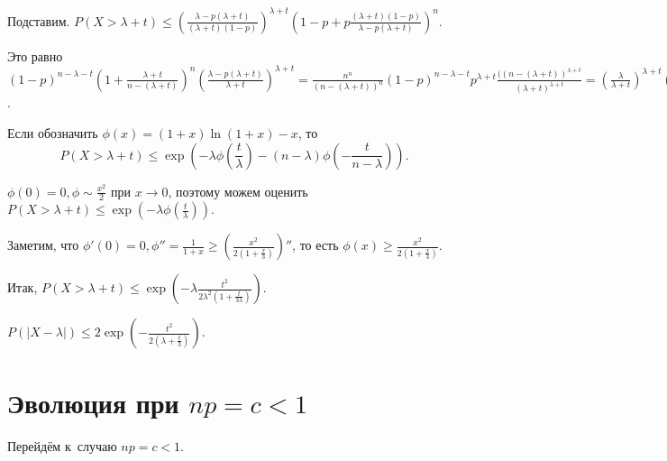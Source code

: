 \documentclass{article}
\begin{document}
Подставим. $P(X > \lambda + t) \le \left(\frac{\lambda - p(\lambda + t)}{(\lambda + t)(1 -
p)}\right)^{\lambda + t} \left(1 - p + p \frac{(\lambda + t)(1 - p)}{\lambda - p(\lambda +
t)}\right)^n$.

Это равно $(1 - p)^{n - \lambda - t} \left(1 + \frac{\lambda + t}{n - (\lambda + t)}\right)^n
\left(\frac{\lambda - p(\lambda + t)}{\lambda + t}\right)^{\lambda + t} = \frac{n^n}{(n - (\lambda +
t))^n} (1 - p)^{n - \lambda - t} p^{\lambda + t} \frac{((n - (\lambda + t))^{\lambda + t}}{(\lambda
+ t)^{\lambda + t}} = \left(\frac{\lambda}{\lambda + t}\right)^{\lambda + t} \left( \frac{n -
\lambda}{n - \lambda - t}\right)^{n - \lambda - t} = \exp(-\lambda (1 + \frac{t}{\lambda})\ln(1 +
\frac{t}{\lambda}) - (n - \lambda)(1 - \frac{t}{n - \lambda}\ln(1 - \frac{t}{n - \lambda})))$.

Если обозначить $\phi(x) = (1 + x)\ln(1 + x) - x$, то
$$P(X > \lambda + t) \le \exp\left(-\lambda \phi(\frac{t}{\lambda}) - (n - \lambda)\phi(-\frac{t}{n -
\lambda})\right).$$

$\phi(0) = 0, \phi \sim \frac{x^2}{2}$ при $x \rightarrow 0$, поэтому можем оценить $P(X > \lambda +
t) \le \exp\left(-\lambda \phi(\frac{t}{\lambda}) \right)$.

Заметим, что $\phi'(0) = 0, \phi'' = \frac{1}{1 + x} \ge \left(
\frac{x^2}{2(1+\frac{x}{3})}\right)''$, то есть $\phi(x) \ge \frac{x^2}{2(1 + \frac{x}{3})}$.

Итак, $P(X > \lambda + t) \le \exp\left(-\lambda \frac{t^2}{2\lambda^2 (1 +
\frac{t}{3\lambda})}\right)$.

\begin{corollary}
	$P(|X - \lambda|) \le 2\exp\left(-\frac{t^2}{2(\lambda + \frac{t}{3})}\right)$.
\end{corollary}

\section{Эволюция при $np = c < 1$}

Перейдём к~случаю $np = c < 1$.
\end{document}
